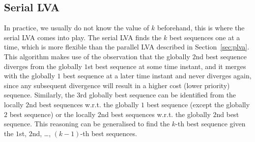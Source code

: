 \subsection{Serial LVA}
\label{sec:slva}

In practice, we usually do not know the value of $k$ beforehand, this is where the serial LVA comes into play.
The serial LVA finds the $k$ best sequences one at a time, which is more flexible than the parallel LVA described in Section~\ref{sec:plva}.
This algorithm makes use of the observation that the globally $2$nd best sequence diverges from the globally $1$st best sequence 
at some time instant, and it merges with the globally $1$ best sequence at a later time instant and never diverges again, 
since any subsequent divergence will result in a higher cost (lower priority) sequence.
Similarly, the $3$rd globally best sequence can be identified from the locally $2$nd best sequences w.r.t. the globally $1$ best sequence 
(except the globally $2$ best sequence) or the locally $2$nd best sequences w.r.t. the globally $2$nd best sequence.
This reasoning can be generalised to find the $k$-th best sequence given the $1$st, $2$nd, \dots, $(k-1)$-th best sequences.

